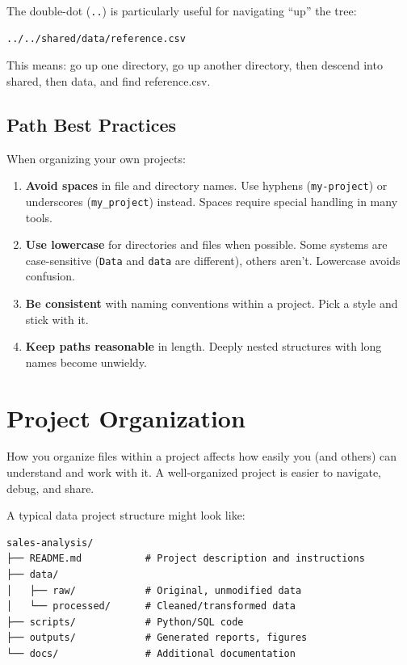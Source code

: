 \documentclass[
  letterpaper,
  DIV=11,
  numbers=noendperiod]{scrreprt}
\begin{document}
The double-dot (\texttt{..}) is particularly useful for navigating
``up'' the tree:

\begin{verbatim}
../../shared/data/reference.csv
\end{verbatim}

This means: go up one directory, go up another directory, then descend
into shared, then data, and find reference.csv.

\subsection{Path Best Practices}\label{path-best-practices}

When organizing your own projects:

\begin{enumerate}
\def\labelenumi{\arabic{enumi}.}
\item
  \textbf{Avoid spaces} in file and directory names. Use hyphens
  (\texttt{my-project}) or underscores (\texttt{my\_project}) instead.
  Spaces require special handling in many tools.
\item
  \textbf{Use lowercase} for directories and files when possible. Some
  systems are case-sensitive (\texttt{Data} and \texttt{data} are
  different), others aren't. Lowercase avoids confusion.
\item
  \textbf{Be consistent} with naming conventions within a project. Pick
  a style and stick with it.
\item
  \textbf{Keep paths reasonable} in length. Deeply nested structures
  with long names become unwieldy.
\end{enumerate}

\section{Project Organization}\label{project-organization}

How you organize files within a project affects how easily you (and
others) can understand and work with it. A well-organized project is
easier to navigate, debug, and share.

A typical data project structure might look like:

\begin{verbatim}
sales-analysis/
├── README.md           # Project description and instructions
├── data/
│   ├── raw/            # Original, unmodified data
│   └── processed/      # Cleaned/transformed data
├── scripts/            # Python/SQL code
├── outputs/            # Generated reports, figures
└── docs/               # Additional documentation
\end{verbatim}
\end{document}
